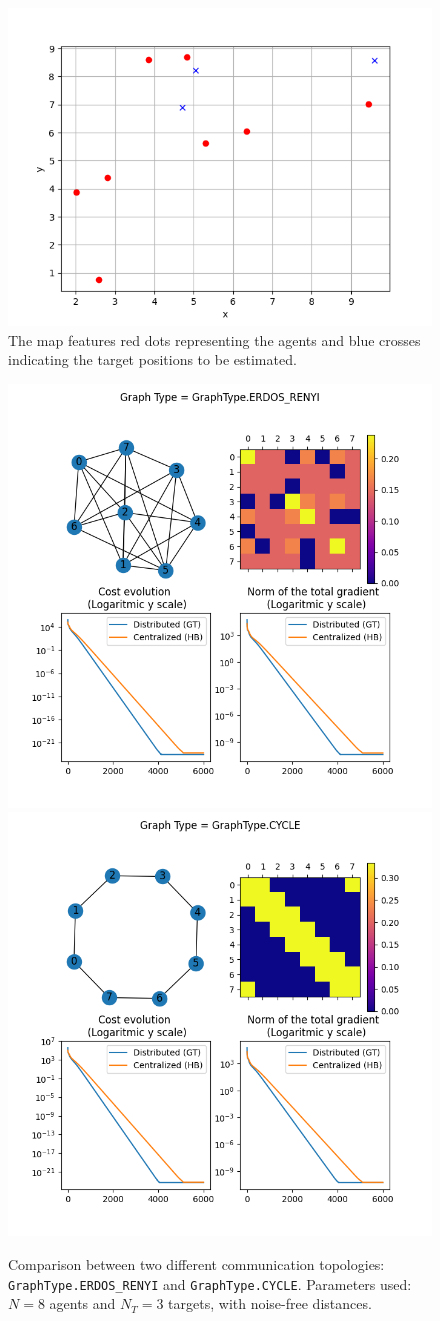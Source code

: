 \begin{figure}[H]
    \centering
    \includegraphics[width=0.5\linewidth]{report/figs/cooperative_localization_map.png}
    \caption{The map features red dots representing the agents and blue crosses indicating the target positions to be estimated.}
    \label{fig:cooperative_localization_map}
\end{figure}

\begin{figure}[H]
    \centering
    \includegraphics[width=0.45\linewidth]{report/figs/cooperative_localization_1_erdos.png}
    \includegraphics[width=0.45\linewidth]{report/figs/cooperative_localization_2_cycle.png}
    \caption{Comparison between two different communication topologies: \texttt{GraphType.ERDOS\_RENYI} and \texttt{GraphType.CYCLE}. Parameters used: $N = 8$ agents and $N_T = 3$ targets, with noise-free distances.}
    \label{fig:cooperative_localization}
\end{figure}

